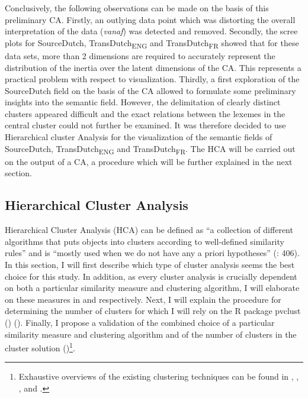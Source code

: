 Conclusively, the following observations can be made on the basis of this preliminary CA. Firstly, an outlying data point which was distorting the overall interpretation of the data (\textit{vanaf}) was detected and removed. Secondly, the scree plots for SourceDutch, TransDutch\textsubscript{ENG} and TransDutch\textsubscript{FR} showed that for these data sets, more than 2 dimensions are required to accurately represent the distribution of the inertia over the latent dimensions of the CA. This represents a practical problem with respect to visualization. Thirdly, a first exploration of the SourceDutch field on the basis of the CA allowed to formulate some preliminary insights into the semantic field. However, the delimitation of clearly distinct clusters appeared difficult and the exact relations between the lexemes in the central cluster could not further be examined. It was therefore decided to use Hierarchical cluster Analysis for the visualization of the semantic fields of SourceDutch, TransDutch\textsubscript{ENG} and TransDutch\textsubscript{FR}. The HCA will be carried out on the output of a CA, a procedure which will be further explained in the next section.


\subsection{\label{sec:3.7.2}  Hierarchical Cluster Analysis}

Hierarchical Cluster Analysis (HCA) can be defined as “a collection of different algorithms that puts objects into clusters according to well-defined similarity rules” and is “mostly used when we do not have any a priori hypotheses” (\citealt{glynn_cluster_2014}: 406). In this section, I will first describe which type of cluster analysis seems the best choice for this study. In addition, as every cluster analysis is crucially dependent on both a particular similarity measure and clustering algorithm, I will elaborate on these measures in  and  respectively. Next, I will explain the procedure for determining the number of clusters for which I will rely on the R package pvclust (\citealt{suzuki_pvclust:_2006}) (). Finally, I propose a validation of the combined choice of a particular similarity measure and clustering algorithm and of the number of clusters in the cluster solution ()\footnote{Exhaustive overviews of the existing clustering techniques can be found in \citet[495-523]{manning_foundations_1999}, \citet[138-148]{baayen_analyzing_2008},  \citet[71-110]{everitt_cluster_2011}, \citet[336-349]{gries_statistics_2013} and \citet{glynn_cluster_2014}.}.



